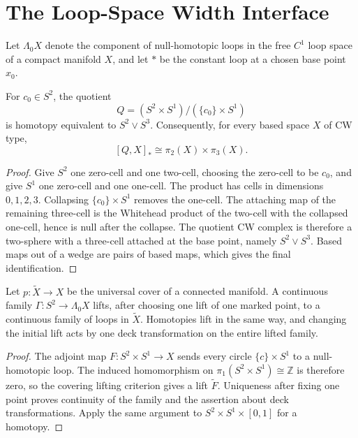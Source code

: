 \section{The Loop-Space Width Interface}

Let $\Lambda_0X$ denote the component of null-homotopic loops in the free
$C^1$ loop space of a compact manifold $X$, and let $*$ be the constant loop
at a chosen base point $x_0$.

\begin{lemma}
\label{lem:loop-space-quotient-wedge}
\notready
For $c_0\in S^2$, the quotient
\[
 Q=(S^2\times S^1)/(\{c_0\}\times S^1)
\]
is homotopy equivalent to $S^2\vee S^3$.  Consequently, for every based
space $X$ of CW type,
\[
 [Q,X]_*\cong\pi_2(X)\times\pi_3(X).
\]
\end{lemma}

\begin{proof}
Give $S^2$ one zero-cell and one two-cell, choosing the zero-cell to be
$c_0$, and give $S^1$ one zero-cell and one one-cell.  The product has cells
in dimensions $0,1,2,3$.  Collapsing $\{c_0\}\times S^1$ removes the
one-cell.  The attaching map of the remaining three-cell is the Whitehead
product of the two-cell with the collapsed one-cell, hence is null after the
collapse.  The quotient CW complex is therefore a two-sphere with a
three-cell attached at the base point, namely $S^2\vee S^3$.  Based maps out
of a wedge are pairs of based maps, which gives the final identification.
\end{proof}

\begin{lemma}
\label{lem:loop-space-universal-cover-lift}
\notready
Let $p\colon\widetilde X\to X$ be the universal cover of a connected
manifold.  A continuous family $\Gamma\colon S^2\to\Lambda_0X$ lifts, after
choosing one lift of one marked point, to a continuous family of loops in
$\widetilde X$.  Homotopies lift in the same way, and changing the initial
lift acts by one deck transformation on the entire lifted family.
\end{lemma}

\begin{proof}
The adjoint map $F\colon S^2\times S^1\to X$ sends every circle
$\{c\}\times S^1$ to a null-homotopic loop.  The induced homomorphism on
$\pi_1(S^2\times S^1)\cong\mathbb Z$ is therefore zero, so the covering
lifting criterion gives a lift $\widetilde F$.  Uniqueness after fixing one
point proves continuity of the family and the assertion about deck
transformations.  Apply the same argument to
$S^2\times S^1\times[0,1]$ for a homotopy.
\end{proof}

